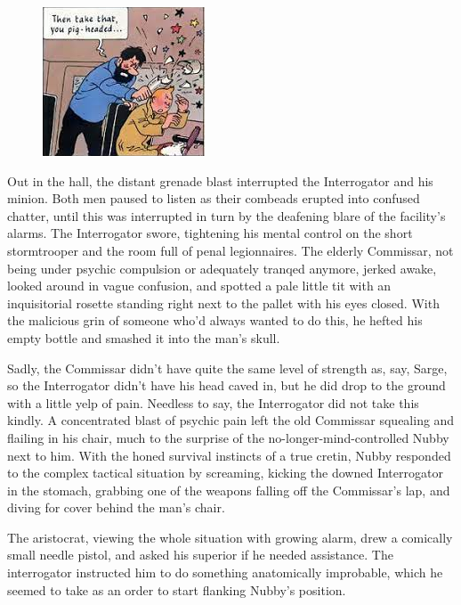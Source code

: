 \begin{figure}
	\begin{center}
		\includegraphics[width=\figwidth]{pics/21/94.png}
	\end{center}
\end{figure}
Out in the hall, the distant grenade blast interrupted the Interrogator and his minion. 
Both men paused to listen as their combeads erupted into confused chatter, until this was interrupted in turn by the deafening blare of the facility's alarms. 
The Interrogator swore, tightening his mental control on the short stormtrooper and the room full of penal legionnaires. 
The elderly Commissar, not being under psychic compulsion or adequately tranqed anymore, jerked awake, looked around in vague confusion, and spotted a pale little tit with an inquisitorial rosette standing right next to the pallet with his eyes closed. 
With the malicious grin of someone who'd always wanted to do this, he hefted his empty bottle and smashed it into the man's skull.

Sadly, the Commissar didn't have quite the same level of strength as, say, Sarge, so the Interrogator didn't have his head caved in, but he did drop to the ground with a little yelp of pain. 
Needless to say, the Interrogator did not take this kindly. 
A concentrated blast of psychic pain left the old Commissar squealing and flailing in his chair, much to the surprise of the no-longer-mind-controlled Nubby next to him. 
With the honed survival instincts of a true cretin, Nubby responded to the complex tactical situation by screaming, kicking the downed Interrogator in the stomach, grabbing one of the weapons falling off the Commissar's lap, and diving for cover behind the man's chair. 


The aristocrat, viewing the whole situation with growing alarm, drew a comically small needle pistol, and asked his superior if he needed assistance. 
The interrogator instructed him to do something anatomically improbable, which he seemed to take as an order to start flanking Nubby's position.

